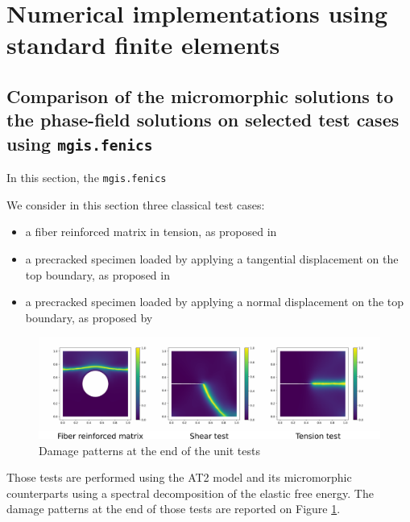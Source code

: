 \section{Numerical implementations using standard finite elements}

\subsection{Comparison of the micromorphic solutions to the phase-field solutions on selected test cases  using \texttt{mgis.fenics}}
\label{sec:micromorphicdamage:test_cases}

In this section, the
\texttt{mgis.fenics}


We consider in this section three classical test cases:

\begin{itemize}
  \item a fiber reinforced matrix in tension, as proposed in \cite{bourdin_numerical_2000}
  \item a precracked specimen loaded by applying a tangential displacement on
  the top boundary, as proposed in \cite{miehe_phase_2010}
  \item a precracked specimen loaded by applying a normal displacement on the
  top boundary, as proposed by \cite{miehe_phase_2010}
\end{itemize}


\begin{figure}[H]
  \centering
  \includegraphics[width=10.cm]{../chapter_02_ef_micromorphic/figures/DamagePattern.pdf}
  \caption{Damage patterns at the end of the unit tests}
  \label{fig:micromorphicdamage:damage_patterns}
\end{figure}


Those tests are performed using the AT2 model and its micromorphic
counterparts using a spectral decomposition of the elastic free energy.
The damage patterns at the end of those tests are reported on Figure
\ref{fig:micromorphicdamage:damage_patterns}.

